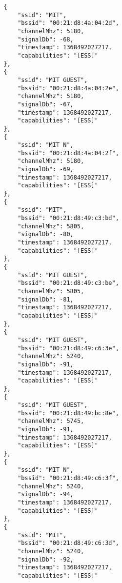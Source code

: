 \begin{verbatim}
                {
                    "ssid": "MIT",
                    "bssid": "00:21:d8:4a:04:2d",
                    "channelMhz": 5180,
                    "signalDb": -68,
                    "timestamp": 1368492027217,
                    "capabilities": "[ESS]"
                },
                {
                    "ssid": "MIT GUEST",
                    "bssid": "00:21:d8:4a:04:2e",
                    "channelMhz": 5180,
                    "signalDb": -67,
                    "timestamp": 1368492027217,
                    "capabilities": "[ESS]"
                },
                {
                    "ssid": "MIT N",
                    "bssid": "00:21:d8:4a:04:2f",
                    "channelMhz": 5180,
                    "signalDb": -69,
                    "timestamp": 1368492027217,
                    "capabilities": "[ESS]"
                },
                {
                    "ssid": "MIT",
                    "bssid": "00:21:d8:49:c3:bd",
                    "channelMhz": 5805,
                    "signalDb": -80,
                    "timestamp": 1368492027217,
                    "capabilities": "[ESS]"
                },
                {
                    "ssid": "MIT GUEST",
                    "bssid": "00:21:d8:49:c3:be",
                    "channelMhz": 5805,
                    "signalDb": -81,
                    "timestamp": 1368492027217,
                    "capabilities": "[ESS]"
                },
                {
                    "ssid": "MIT GUEST",
                    "bssid": "00:21:d8:49:c6:3e",
                    "channelMhz": 5240,
                    "signalDb": -91,
                    "timestamp": 1368492027217,
                    "capabilities": "[ESS]"
                },
                {
                    "ssid": "MIT GUEST",
                    "bssid": "00:21:d8:49:bc:8e",
                    "channelMhz": 5745,
                    "signalDb": -91,
                    "timestamp": 1368492027217,
                    "capabilities": "[ESS]"
                },
                {
                    "ssid": "MIT N",
                    "bssid": "00:21:d8:49:c6:3f",
                    "channelMhz": 5240,
                    "signalDb": -94,
                    "timestamp": 1368492027217,
                    "capabilities": "[ESS]"
                },
                {
                    "ssid": "MIT",
                    "bssid": "00:21:d8:49:c6:3d",
                    "channelMhz": 5240,
                    "signalDb": -92,
                    "timestamp": 1368492027217,
                    "capabilities": "[ESS]"

\end{verbatim}
